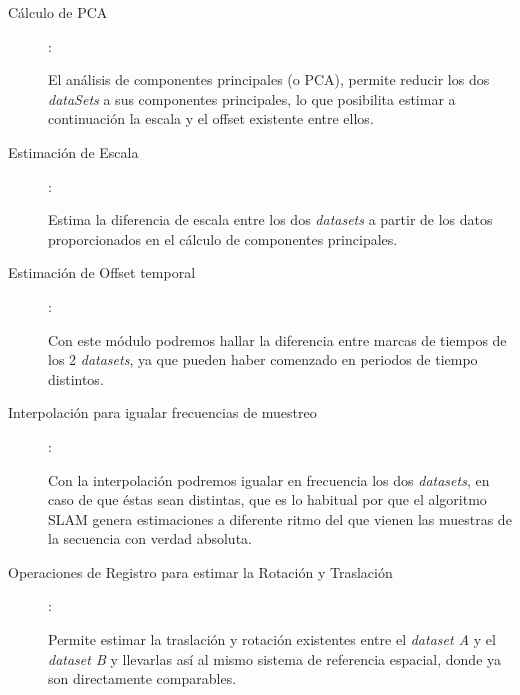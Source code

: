 \begin{description}
\item [Cálculo de PCA]:

El análisis de componentes principales (o PCA), permite reducir los dos  \textit{dataSets} a sus componentes principales, lo que posibilita estimar a continuación la escala y el offset existente entre ellos.
\item [Estimación de Escala]: 

Estima la diferencia de escala entre los dos \textit{datasets} a partir de los datos proporcionados en el cálculo de componentes principales.
\item [Estimación de Offset temporal]: 

Con este módulo podremos hallar la diferencia entre marcas de tiempos de los 2 \textit{datasets}, ya que pueden haber comenzado en periodos de tiempo distintos.
\item [Interpolación para igualar frecuencias de muestreo]: 

Con la interpolación podremos igualar en frecuencia los dos \textit{datasets}, en caso de que éstas sean distintas, que es lo habitual por que el algoritmo SLAM genera estimaciones a diferente ritmo del que vienen las muestras de la secuencia con verdad absoluta.

\item [Operaciones de Registro para estimar la Rotación y Traslación]: 

Permite estimar la traslación y rotación existentes entre el \textit{dataset A} y el \textit{dataset B} y llevarlas así al mismo sistema de referencia espacial, donde ya son directamente comparables.
\end{description}


